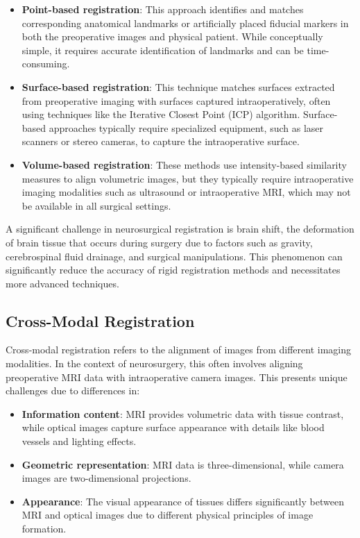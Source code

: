 \begin{itemize}
    \item \textbf{Point-based registration}: This approach identifies and matches corresponding anatomical landmarks or artificially placed fiducial markers in both the preoperative images and physical patient. While conceptually simple, it requires accurate identification of landmarks and can be time-consuming. \parencite{Fitzpatrick1998Predicting}
    
    \item \textbf{Surface-based registration}: This technique matches surfaces extracted from preoperative imaging with surfaces captured intraoperatively, often using techniques like the Iterative Closest Point (ICP) algorithm. Surface-based approaches typically require specialized equipment, such as laser scanners or stereo cameras, to capture the intraoperative surface. \parencite{CLARKSON2011856}
    
    \item \textbf{Volume-based registration}: These methods use intensity-based similarity measures to align volumetric images, but they typically require intraoperative imaging modalities such as ultrasound or intraoperative MRI, which may not be available in all surgical settings. \parencite{Klein2010Evaluation}
\end{itemize}

A significant challenge in neurosurgical registration is brain shift, the deformation of brain tissue that occurs during surgery due to factors such as gravity, cerebrospinal fluid drainage, and surgical manipulations. This phenomenon can significantly reduce the accuracy of rigid registration methods and necessitates more advanced techniques.

\subsection{Cross-Modal Registration}

Cross-modal registration refers to the alignment of images from different imaging modalities. In the context of neurosurgery, this often involves aligning preoperative MRI data with intraoperative camera images. This presents unique challenges due to differences in:

\begin{itemize}
    \item \textbf{Information content}: MRI provides volumetric data with tissue contrast, while optical images capture surface appearance with details like blood vessels and lighting effects. \parencite{Choe2011Accuracy}
    \item \textbf{Geometric representation}: MRI data is three-dimensional, while camera images are two-dimensional projections. \parencite{Unberath2021The}
    \item \textbf{Appearance}: The visual appearance of tissues differs significantly between MRI and optical images due to different physical principles of image formation. \parencite{Xie2023Cross}
\end{itemize}

